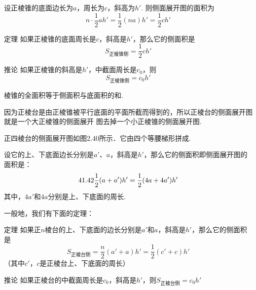 设正棱锥的底面边长为$a$，周长为$c$，斜高为$h'$. 则侧面展开图的面积为
\[n\cdot \frac{1}{2}ah'=\frac{1}{2}(na)h'=\frac{1}{2}ch'\]

\begin{thm}
  {定理} 如果正棱锥的底面周长是$c$，斜高是$h'$，那么它的侧面积是
\[S_{\text{正棱锥侧}}=\frac{1}{2}ch'\]  
\end{thm}

\begin{thm}
 {推论} 如果正棱锥的斜高是$h'$，中截面周长是$c_0$，则
 \[S_{\text{正棱锥侧}}=c_0 h'\]   
\end{thm}

\noindent
\begin{minipage}{.53\textwidth}
\CTEXindent
棱锥的全面积等于侧面积与底面积的和.

因为正棱台是由正棱锥被平行底面的平面所截而得到的，所以正棱台的侧面展开图就是一个大正棱锥的侧面展开
图去掉一个小正棱锥的侧面展开图.

正四棱台的侧面展开图如图2.40所示．它由四个等腰梯形拼成.
\end{minipage}
\hfill
\begin{minipage}{.45\textwidth}
\centering
{}
\end{minipage}

设它的上、下底面边长分别是$a'$、$a$，斜高是$h'$，那么它的侧面积即侧面展开图的面积是：
\[41.42\dfrac{1}{2}(a+a')h'=\dfrac{1}{2}(4a+4a')h'\]
其中，$4a'$和$4a$分别是上、下底面的周长.

一般地，我们有下面的定理：

\begin{thm}
    {定理} 如果正$n$棱台的上、下底面的边长分别是$a'$和$a$，斜高是$h'$，那么它的侧面积是
\[S_{\text{正棱台侧}}=\frac{n}{2}(a'+a)h'=\frac{1}{2}(c'+c)h'\]
（其中$c'$，$c$是正棱台上、下底面的周长）
\end{thm}

\begin{thm}
    {推论} 如果正棱台的中截面周长是$c_0$，斜高是$h'$，则$S_{\text{正棱台侧}}=c_0h'$
\end{thm}


